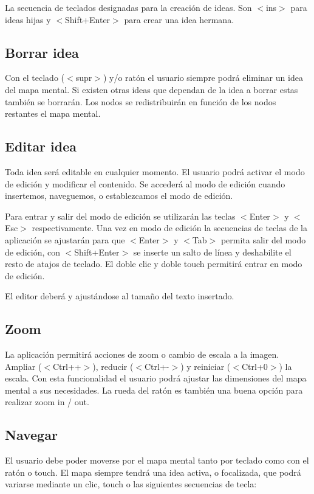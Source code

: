 La secuencia de teclados designadas para la creación de ideas. Son $<$ins$>$ para ideas hijas y $<$Shift+Enter$>$ para crear una idea hermana. 

\subsection{Borrar idea}
Con el teclado ($<$supr$>$) y/o ratón el usuario siempre podrá eliminar un idea del mapa mental. Si existen otras ideas que dependan de la idea a borrar estas también se borrarán. Los nodos se redistribuirán en función de los nodos restantes el mapa mental. 

\subsection{Editar idea}
Toda idea será editable en cualquier momento. El usuario podrá activar el modo de edición y modificar el contenido. Se accederá al modo de edición cuando insertemos, naveguemos, o establezcamos el modo de edición. 

Para entrar y salir del modo de edición se utilizarán las teclas $<$Enter$>$ y $<$Esc$>$ respectivamente. Una vez en modo de edición la secuencias de teclas de la aplicación se ajustarán para que $<$Enter$>$ y $<$Tab$>$ permita salir del modo de edición, con $<$Shift+Enter$>$ se inserte un salto de línea y deshabilite el resto de atajos de teclado. El doble clic y doble touch permitirá entrar en modo de edición.

El editor deberá y ajustándose al tamaño del texto insertado.   

\subsection{Zoom}
La aplicación permitirá acciones de zoom o cambio de escala a la imagen. Ampliar ($<$Ctrl++$>$), reducir ($<$Ctrl+-$>$) y reiniciar ($<$Ctrl+0$>$) la escala. Con esta funcionalidad el usuario podrá ajustar las dimensiones del mapa mental a sus necesidades. La rueda del ratón es también una buena opción para realizar zoom in / out.

\subsection{Navegar}
El usuario debe poder moverse por el mapa mental tanto por teclado como con el ratón o touch. El mapa siempre tendrá una idea activa, o focalizada, que podrá variarse mediante un clic, touch o las siguientes secuencias de tecla:

